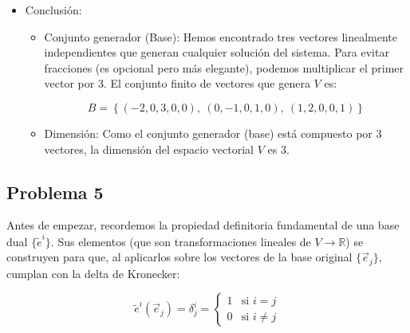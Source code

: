 \documentclass[11pt,spanish]{article}
\begin{document}
\begin{itemize}
\item Conclusión:

\begin{itemize}
\item Conjunto generador (Base): Hemos encontrado tres vectores linealmente independientes que generan cualquier solución del sistema. Para evitar fracciones (es opcional pero más elegante), podemos multiplicar el primer vector por $3$. El conjunto finito de vectores que genera $V$ es:

$$B = \left\{ (-2, 0, 3, 0, 0), \ (0, -1, 0, 1, 0), \ (1, 2, 0, 0, 1) \right\}$$

\item Dimensión: Como el conjunto generador (base) está compuesto por 3 vectores, la dimensión del espacio vectorial $V$ es $3$.

\end{itemize}
\end{itemize} 

\subsection*{Problema 5}

Antes de empezar, recordemos la propiedad definitoria fundamental de una base dual $\{\tilde{e}^i\}$. Sus elementos (que son transformaciones lineales de $V \to \mathbb{R}$) se construyen para que, al aplicarlos sobre los vectores de la base original $\{\vec{e}_j\}$, cumplan con la delta de Kronecker:

$$\tilde{e}^i(\vec{e}_j) = \delta^i_j = \begin{cases} 1 & \text{si } i = j \\ 0 & \text{si } i \neq j \end{cases}$$
\end{document}
